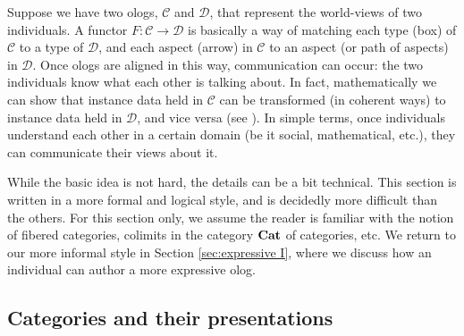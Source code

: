 \documentclass{amsart}
\def\to{\rightarrow}
\def\taking{\colon}
\def\Cat{{\bf Cat}}
\def\mcC{{\mathcal C}}
\def\mcD{{\mathcal D}}
\theoremstyle{remark}
\theoremstyle{definition}
\begin{document}
Suppose we have two ologs, $\mcC$ and $\mcD$, that represent the world-views of two individuals. 
A functor $F\taking\mcC\to\mcD$ is basically a way of matching each type (box) of $\mcC$ to a type of $\mcD$, 
and each aspect (arrow) in $\mcC$ to an aspect (or path of aspects) in $\mcD$. 
Once ologs are aligned in this way, communication can occur: 
the two individuals know what each other is talking about. 
In fact, 
mathematically we can show that 
instance data held in $\mcC$ can be transformed (in coherent ways) to instance data held in $\mcD$, 
and vice versa (see \cite{Spi-FDM}).
In simple terms, 
once individuals understand each other in a certain domain (be it social, mathematical, etc.), 
they can communicate their views about it.

While the basic idea is not hard, the details can be a bit technical. This section is written in a more formal and logical style, and is decidedly more difficult than the others. For this section only, we assume the reader is familiar with the notion of fibered categories, colimits in the category $\Cat$ of categories, etc. We return to our more informal style in Section \ref{sec:expressive I}, where we discuss how an individual can author a more expressive olog.

\subsection{Categories and their presentations}
\end{document}
